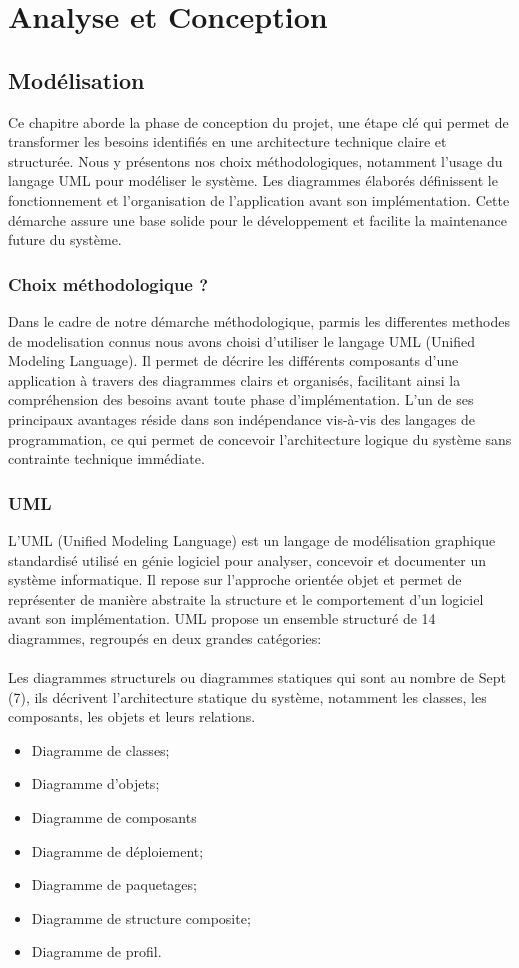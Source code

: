 \chapter{Analyse et Conception}

\section{Modélisation}
Ce chapitre aborde la phase de conception du projet, une étape clé qui permet de transformer les besoins identifiés en une architecture technique claire et structurée. Nous y présentons nos choix méthodologiques, notamment l’usage du langage UML pour modéliser le système. Les diagrammes élaborés définissent le fonctionnement et l’organisation de l’application avant son implémentation. Cette démarche assure une base solide pour le développement et facilite la maintenance future du système.

\subsection{Choix méthodologique ?}
Dans le cadre de notre démarche méthodologique, parmis les differentes methodes de modelisation connus nous avons choisi d’utiliser le langage UML (Unified Modeling Language). Il permet de décrire les différents composants d’une application à travers des diagrammes clairs et organisés, facilitant ainsi la compréhension des besoins avant toute phase d’implémentation. L’un de ses principaux avantages réside dans son indépendance vis-à-vis des langages de programmation, ce qui permet de concevoir l’architecture logique du système sans contrainte technique immédiate.

\subsection{  UML}
L’UML (Unified Modeling Language) est un langage de modélisation graphique standardisé utilisé en génie logiciel pour analyser, concevoir et documenter un système informatique. Il repose sur l’approche orientée objet et permet de représenter de manière abstraite la structure et le comportement d’un logiciel avant son implémentation. UML propose un ensemble structuré de 14 diagrammes, regroupés en deux grandes catégories:\\ \\
Les diagrammes structurels ou diagrammes statiques qui sont au nombre de Sept (7), ils décrivent l’architecture statique du système, notamment les classes, les composants, les objets et leurs relations.
\begin{itemize}
\item Diagramme de classes;
\item Diagramme d’objets;
\item Diagramme de composants
\item Diagramme de déploiement;
\item Diagramme de paquetages;
\item Diagramme de structure composite;
\item Diagramme de profil.
\end{itemize} \\[5cm] \newline

